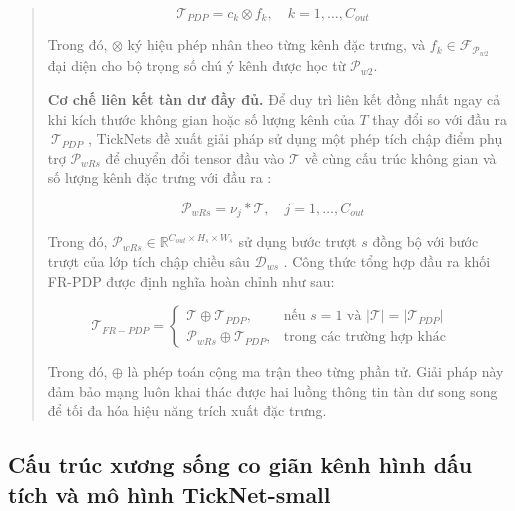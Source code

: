 \documentclass[
  12pt,
  a4paper,
]{report}
\begin{document}
\begin{quote}
\[\mathcal{T}_{PDP} = c_{k} \otimes f_{k},\quad k = 1,\ldots,C_{out}\quad\]

Trong đó, \(\otimes\) ký hiệu phép nhân theo từng kênh đặc trưng, và
\(f_{k} \in \mathcal{F}_{\mathcal{P}_{w2}}\) đại diện cho bộ trọng số
chú ý kênh được học từ \(\mathcal{P}_{w2}\).

\textbf{Cơ chế liên kết tàn dư đầy đủ.} Để duy trì liên kết đồng nhất
ngay cả khi kích thước không gian hoặc số lượng kênh của \(T\) thay đổi
so với đầu ra \(\ \mathcal{T}_{PDP}\) , TickNets đề xuất giải pháp sử
dụng một phép tích chập điểm phụ trợ \(\mathcal{P}_{wRs}\) để chuyển đổi
tensor đầu vào \(\mathcal{T}\) về cùng cấu trúc không gian và số lượng
kênh đặc trưng với đầu ra :

\[\mathcal{P}_{wRs} = \nu_{j}*\mathcal{T},\quad j = 1,\ldots,C_{out}\quad\]

Trong đó,
\(\mathcal{P}_{wRs} \in \mathbb{R}^{C_{out} \times H_{s} \times W_{s}}\)
sử dụng bước trượt \(s\) đồng bộ với bước trượt của lớp tích chập chiều
sâu \(\mathcal{D}_{ws}\) . Công thức tổng hợp đầu ra khối FR-PDP được
định nghĩa hoàn chỉnh như sau:

\[\mathcal{T}_{FR - PDP} = \left\{ \begin{matrix}
\mathcal{T} \oplus \mathcal{T}_{PDP}, & \text{nếu~}s = 1\text{~và~}\left| \mathcal{T} \right| = \left| \mathcal{T}_{PDP} \right| \\
\mathcal{P}_{wRs} \oplus \mathcal{T}_{PDP}, & \text{trong~các~trường~hợp~khác}
\end{matrix} \right.\ \quad\]

Trong đó, \(\oplus\) là phép toán cộng ma trận theo từng phần tử. Giải
pháp này đảm bảo mạng luôn khai thác được hai luồng thông tin tàn dư
song song để tối đa hóa hiệu năng trích xuất đặc trưng.
\end{quote}

\subsection{Cấu trúc xương sống co giãn kênh hình dấu tích và mô hình
TickNet-small}\label{cux1ea5u-truxfac-xux1b0ux1a1ng-sux1ed1ng-co-giuxe3n-kuxeanh-huxecnh-dux1ea5u-tuxedch-vuxe0-muxf4-huxecnh-ticknet-small}
\end{document}
